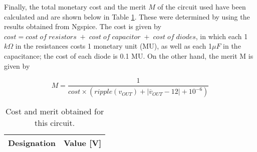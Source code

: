 \par

Finally, the total monetary cost and the merit $M$ of the circuit used have been calculated and are shown below in Table \ref{tab:rip}. These were determined by using the results obtained from Ngspice. The cost is given by $cost=cost\; of\; resistors\; +\; cost\; of\; capacitor\; +\; cost\; of\; diodes$, in which each 1$k\Omega$ in the resistances costs 1 monetary unit (MU), as well as each 1$\mu F$ in the capacitance; the cost of each diode is 0.1 MU. On the other hand, the  merit M is given by

\begin{equation} \label{eq:merit}
  M=\frac{1}{cost\times (ripple(v_{OUT})+|\overline{v}_{OUT}-12|+10^{-6})} 
\end{equation}


\begin{table}[H]
  \centering
  \begin{tabular}{|c|c|}
    \hline
        {\bf Designation} & {\bf Value [V]} \\ \hline
        
  \end{tabular}
  \caption{Cost and merit obtained for this circuit.} 
  \label{tab:rip}
\end{table}

